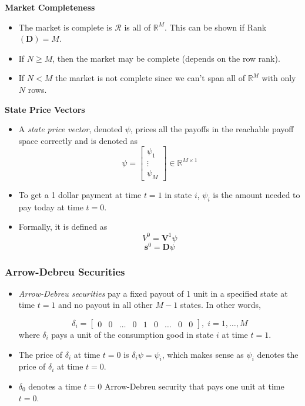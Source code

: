 \documentclass[11pt]{article}
\begin{document}
\textbf{Market Completeness}
\begin{itemize}
    \item The market is complete is $\mathcal{R}$ is all of $\mathbb{R}^M$. This can be shown 
    if Rank$(\boldsymbol{D}) = M$.
    \item If $N \ge M$, then the market may be complete (depends on the row rank).
    \item If $N < M$ the market is not complete since we can't span all of $\mathbb{R}^M$ with 
    only $N$ rows.
\end{itemize}

\textbf{State Price Vectors}
\begin{itemize}
    \item A \textit{state price vector}, denoted $\psi$, prices all the payoffs in the 
    reachable payoff space correctly and is denoted as 
    \[
    \psi = \begin{bmatrix}
        \psi_1 \\ 
        \vdots \\
        \psi_M
    \end{bmatrix} \in \mathbb{R}^{M \times 1}
    \]
    \item To get a 1 dollar payment at time $t=1$ in state $i$, $\psi_i$ is the amount needed
    to pay today at time $t=0$.
    \item Formally, it is defined as
    \[V^0 = \boldsymbol{V}^1 \psi\]
    \[\boldsymbol{s}^0 = \boldsymbol{D} \psi\]
\end{itemize}

\subsubsection{Arrow-Debreu Securities}
\begin{itemize}
    \item \textit{Arrow-Debreu securities} pay a fixed payout of 1 unit in a specified state at
    time $t=1$ and no payout in all other $M-1$ states. In other words, 

    \[ 
    \delta_i = 
    \begin{bmatrix}
        0 & 0 & \hdots & 0 & 1 & 0 & \hdots & 0 & 0
    \end{bmatrix}, \; i = 1, \ldots, M
    \]
    where $\delta_i$ pays a unit of the consumption good in state $i$ at time $t=1$.
    \item The price of $\delta_i$ at time $t=0$ is $\delta_i \psi = \psi_i$, which makes sense 
    as $\psi_i$ denotes the price of $\delta_i$ at time $t=0$.
    \item $\delta_0$ denotes a time $t=0$ Arrow-Debreu security that pays one unit at time 
    $t=0$.
\end{itemize}
\end{document}
